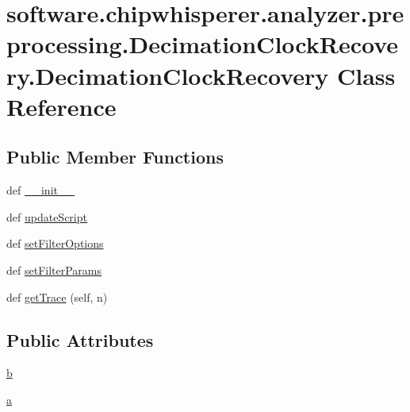\hypertarget{classsoftware_1_1chipwhisperer_1_1analyzer_1_1preprocessing_1_1DecimationClockRecovery_1_1DecimationClockRecovery}{}\section{software.\+chipwhisperer.\+analyzer.\+preprocessing.\+Decimation\+Clock\+Recovery.\+Decimation\+Clock\+Recovery Class Reference}
\label{classsoftware_1_1chipwhisperer_1_1analyzer_1_1preprocessing_1_1DecimationClockRecovery_1_1DecimationClockRecovery}
\subsection*{Public Member Functions}
\begin{DoxyCompactItemize}
\item 
def \hyperlink{classsoftware_1_1chipwhisperer_1_1analyzer_1_1preprocessing_1_1DecimationClockRecovery_1_1DecimationClockRecovery_a9831cc7707cd64b2d567ea29cafcfc84}{\+\_\+\+\_\+init\+\_\+\+\_\+}
\item 
def \hyperlink{classsoftware_1_1chipwhisperer_1_1analyzer_1_1preprocessing_1_1DecimationClockRecovery_1_1DecimationClockRecovery_a5b24a57e89b75cc6fcd07c1e3fdc3d18}{update\+Script}
\item 
def \hyperlink{classsoftware_1_1chipwhisperer_1_1analyzer_1_1preprocessing_1_1DecimationClockRecovery_1_1DecimationClockRecovery_a3c1e5447c1900fd1b000d923544cbe5e}{set\+Filter\+Options}
\item 
def \hyperlink{classsoftware_1_1chipwhisperer_1_1analyzer_1_1preprocessing_1_1DecimationClockRecovery_1_1DecimationClockRecovery_a7750a3577e1f40ee33c93e2fc346efe1}{set\+Filter\+Params}
\item 
def \hyperlink{classsoftware_1_1chipwhisperer_1_1analyzer_1_1preprocessing_1_1DecimationClockRecovery_1_1DecimationClockRecovery_ae71003959960474875ed115ae44a1224}{get\+Trace} (self, n)
\end{DoxyCompactItemize}
\subsection*{Public Attributes}
\begin{DoxyCompactItemize}
\item 
\hyperlink{classsoftware_1_1chipwhisperer_1_1analyzer_1_1preprocessing_1_1DecimationClockRecovery_1_1DecimationClockRecovery_a6bd98870495dc0b2d3bc1a4f7f912e4d}{b}
\item 
\hyperlink{classsoftware_1_1chipwhisperer_1_1analyzer_1_1preprocessing_1_1DecimationClockRecovery_1_1DecimationClockRecovery_ae37f2a4c14b74f697a34038afd39d632}{a}
\end{DoxyCompactItemize}


